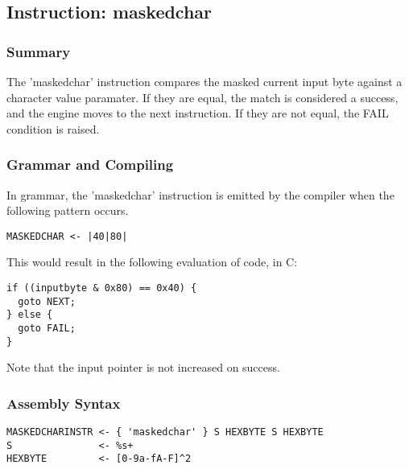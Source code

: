 \subsection{Instruction: maskedchar}

\subsubsection{Summary}

The 'maskedchar' instruction compares the masked current input byte
against a character value paramater.
If they are
equal, the match is considered a success, and the engine moves to the
next instruction. If they are not equal, the FAIL condition is raised.

\subsubsection{Grammar and Compiling}

In grammar, the 'maskedchar' instruction is emitted by the compiler
when the following pattern occurs.

\begin{myquote}
\begin{verbatim}
MASKEDCHAR <- |40|80|

\end{verbatim}
\end{myquote}

This would result in the following evaluation of code, in C:

\begin{myquote}
\begin{verbatim}
if ((inputbyte & 0x80) == 0x40) {
  goto NEXT;
} else {
  goto FAIL;
}

\end{verbatim}
\end{myquote}

Note that the input pointer is not increased on success.

\subsubsection{Assembly Syntax}

\begin{myquote}
\begin{verbatim}
MASKEDCHARINSTR <- { 'maskedchar' } S HEXBYTE S HEXBYTE
S               <- %s+
HEXBYTE         <- [0-9a-fA-F]^2

\end{verbatim}
\end{myquote}

